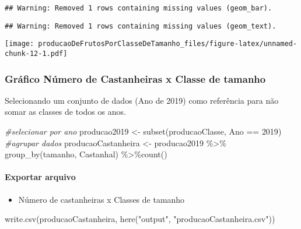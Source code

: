 \documentclass[
]{article}
\newenvironment{Shaded}{\begin{snugshade}}{\end{snugshade}}
\newcommand{\CommentTok}[1]{\textcolor[rgb]{0.56,0.35,0.01}{\textit{#1}}}
\newcommand{\DecValTok}[1]{\textcolor[rgb]{0.00,0.00,0.81}{#1}}
\newcommand{\FunctionTok}[1]{\textcolor[rgb]{0.00,0.00,0.00}{#1}}
\newcommand{\NormalTok}[1]{#1}
\newcommand{\OtherTok}[1]{\textcolor[rgb]{0.56,0.35,0.01}{#1}}
\newcommand{\SpecialCharTok}[1]{\textcolor[rgb]{0.00,0.00,0.00}{#1}}
\newcommand{\StringTok}[1]{\textcolor[rgb]{0.31,0.60,0.02}{#1}}
\providecommand{\tightlist}{%
  \setlength{\itemsep}{0pt}\setlength{\parskip}{0pt}}
\begin{document}
\begin{verbatim}
## Warning: Removed 1 rows containing missing values (geom_bar).
\end{verbatim}

\begin{verbatim}
## Warning: Removed 1 rows containing missing values (geom_text).
\end{verbatim}

\texttt{[image: producaoDeFrutosPorClasseDeTamanho\_files/figure-latex/unnamed-chunk-12-1.pdf]}

\hypertarget{gruxe1fico-nuxfamero-de-castanheiras-x-classe-de-tamanho}{%
\subsubsection{Gráfico Número de Castanheiras x Classe de
tamanho}\label{gruxe1fico-nuxfamero-de-castanheiras-x-classe-de-tamanho}}

Selecionando um conjunto de dados (Ano de 2019) como referência para não
somar as classes de todos os anos.

\begin{Shaded}
\begin{Highlighting}[]
\CommentTok{\#selecionar por ano}
\NormalTok{producao2019 }\OtherTok{\textless{}{-}} \FunctionTok{subset}\NormalTok{(producaoClasse, Ano }\SpecialCharTok{==} \DecValTok{2019}\NormalTok{)}
\CommentTok{\#agrupar dados}
\NormalTok{producaoCastanheira }\OtherTok{\textless{}{-}}\NormalTok{ producao2019 }\SpecialCharTok{\%\textgreater{}\%} \FunctionTok{group\_by}\NormalTok{(tamanho, Castanhal) }\SpecialCharTok{\%\textgreater{}\%}\FunctionTok{count}\NormalTok{()}
\end{Highlighting}
\end{Shaded}

\hypertarget{exportar-arquivo}{%
\paragraph{Exportar arquivo}\label{exportar-arquivo}}

\begin{itemize}
\tightlist
\item
  Número de castanheiras x Classes de tamanho
\end{itemize}

\begin{Shaded}
\begin{Highlighting}[]
\FunctionTok{write.csv}\NormalTok{(producaoCastanheira, }\FunctionTok{here}\NormalTok{(}\StringTok{"output"}\NormalTok{, }\StringTok{"producaoCastanheira.csv"}\NormalTok{))}
\end{Highlighting}
\end{Shaded}
\end{document}
